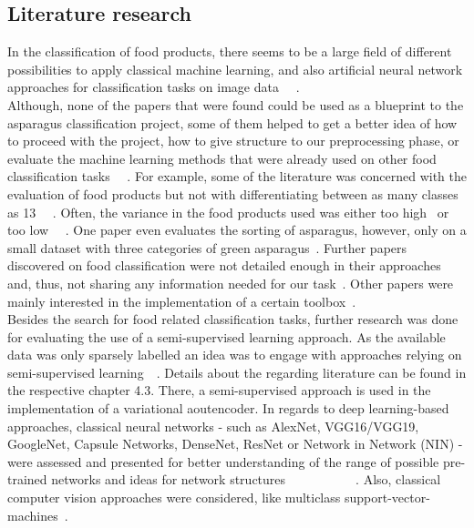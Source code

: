 \subsection{Literature research}
\label{sec:Literature}

In the classification of food products, there seems to be a large field of different possibilities to apply classical machine learning, and also artificial neural network approaches for classification tasks on image data~\citep{bhargava2018fruits} ~\citep{brosnan2002inspection}. \\
Although, none of the papers that were found could be used as a blueprint to the asparagus classification project, some of them helped to get a better idea of how to proceed with the project, how to give structure to our preprocessing phase, or evaluate the machine learning methods that were already used on other food classification tasks~\citep{mery2013automated} ~\citep{bhargava2018fruits}. For example, some of the literature was concerned with the evaluation of food products but not with differentiating between as many classes as 13~\citep{diaz2004comparison} ~\citep{kilicc2007classification}. Often, the variance in the food products used was either too high~\citep{zhang2012classification} or too low~\citep{kilicc2007classification} ~\citep{al2011dates}.  One paper even evaluates the sorting of asparagus, however, only on a small dataset with three categories of green asparagus~\citep{donis2016classification}. Further papers discovered on food classification were not detailed enough in their approaches and, thus, not sharing any information needed for our task~\citep{pedreschi2016grading}. Other papers were mainly interested in the implementation of a certain toolbox~\citep{mery2013automated}. \\
Besides the search for food related classification tasks, further research was done for evaluating the use of a semi-supervised learning approach. As the available data was only sparsely labelled an idea was to engage with approaches relying on semi-supervised learning~\citep{olivier2006semi}~\citep{zhu05survey}. Details about the regarding literature can be found in the respective chapter 4.3. There, a semi-supervised approach is used in the implementation of a variational aoutencoder. In regards to deep learning-based approaches, classical neural networks - such as AlexNet, VGG16/VGG19, GoogleNet, Capsule Networks,  DenseNet, ResNet or Network in Network (NIN) - were assessed and presented for better understanding of the range of possible pre-trained networks and ideas for network structures~\citep{alexnet2012original} ~\citep{vgg2014original} ~\citep{googlenet2015original} ~\citep{capsulenet2017original} ~\citep{densenet2017original} ~\citep{resnet2016original} ~\citep{lin2013network}. Also, classical computer vision approaches were considered, like multiclass support-vector-machines~\citep{prakash2012multi}. \\
